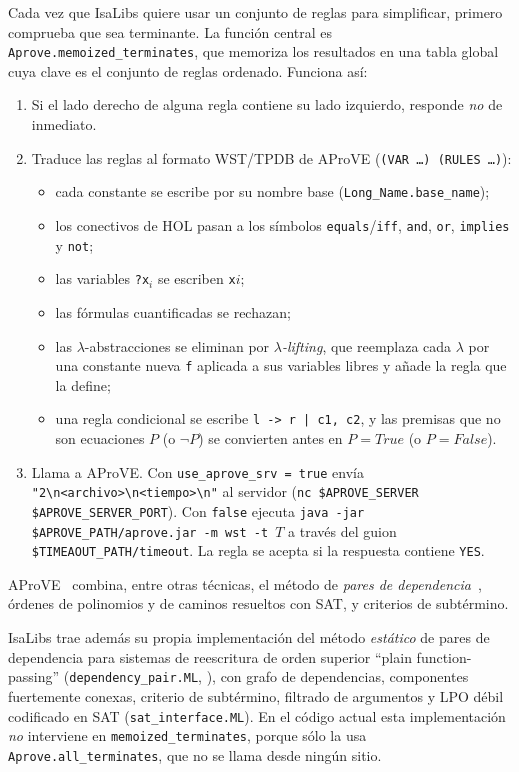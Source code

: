\documentclass[11pt,a4paper]{article}
\newcommand{\isa}[1]{\texttt{#1}}
\theoremstyle{definition}
\theoremstyle{remark}
\begin{document}
Cada vez que IsaLibs quiere usar un conjunto de reglas para simplificar, primero
comprueba que sea terminante. La función central es
\isa{Aprove.memoized\_terminates}, que memoriza los resultados en una tabla global
cuya clave es el conjunto de reglas ordenado. Funciona así:
\begin{enumerate}[nosep]
  \item Si el lado derecho de alguna regla contiene su lado izquierdo, responde
        \emph{no} de inmediato.
  \item Traduce las reglas al formato WST/TPDB de AProVE
        (\isa{(VAR \ldots) (RULES \ldots)}):
    \begin{itemize}[nosep]
      \item cada constante se escribe por su nombre base (\isa{Long\_Name.base\_name});
      \item los conectivos de HOL pasan a los símbolos \isa{equals}/\isa{iff},
            \isa{and}, \isa{or}, \isa{implies} y \isa{not};
      \item las variables \isa{?x$_i$} se escriben \isa{x$i$};
      \item las fórmulas cuantificadas se rechazan;
      \item las $\lambda$-abstracciones se eliminan por \emph{$\lambda$-lifting},
            que reemplaza cada $\lambda$ por una constante nueva \isa{f} aplicada a
            sus variables libres y añade la regla que la define;
      \item una regla condicional se escribe \isa{l -> r | c1, c2}, y las
            premisas que no son ecuaciones $P$ (o $\neg P$) se convierten antes
            en $P = \mathit{True}$ (o $P = \mathit{False}$).
    \end{itemize}
  \item Llama a AProVE. Con \isa{use\_aprove\_srv = true} envía
        \isa{"2\textbackslash n<archivo>\textbackslash n<tiempo>\textbackslash n"} al
        servidor (\isa{nc \$APROVE\_SERVER \$APROVE\_SERVER\_PORT}). Con
        \isa{false} ejecuta
        \isa{java -jar \$APROVE\_PATH/aprove.jar -m wst -t $T$} a través del guion
        \isa{\$TIMEAOUT\_PATH/timeout}.
        La regla se acepta si la respuesta contiene \isa{YES}.
\end{enumerate}
AProVE~\cite{aprove} combina, entre otras técnicas, el método de \emph{pares de
dependencia}~\cite{arts-giesl}, órdenes de polinomios y de caminos resueltos con SAT,
y criterios de subtérmino.

IsaLibs trae además su propia implementación del método \emph{estático} de pares de
dependencia para sistemas de reescritura de orden superior ``plain function-passing''
(\isa{dependency\_pair.ML}, \cite{kusakari}), con grafo de dependencias, componentes
fuertemente conexas, criterio de subtérmino, filtrado de argumentos y LPO débil
codificado en SAT (\isa{sat\_interface.ML}). En el código actual esta implementación
\emph{no} interviene en \isa{memoized\_terminates}, porque sólo la usa
\isa{Aprove.all\_terminates}, que no se llama desde ningún sitio.
\end{document}

